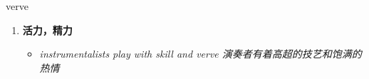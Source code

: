 
\begin{frame}
{\huge verve}
\begin{center}
\begin{enumerate}\Large
  \item \textbf{活力，精力}
  \begin{itemize}
    \item \em{\Large{instrumentalists play with skill and verve 演奏者有着高超的技艺和饱满的热情}}
  \end{itemize}
\end{enumerate}
\end{center}
\end{frame}

